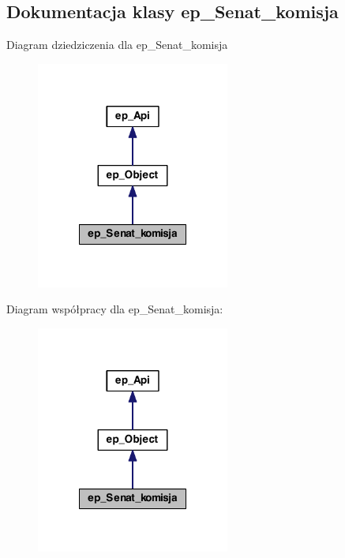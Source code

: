 \hypertarget{classep___senat__komisja}{\subsection{Dokumentacja klasy ep\-\_\-\-Senat\-\_\-komisja}
\label{classep___senat__komisja}
}


Diagram dziedziczenia dla ep\-\_\-\-Senat\-\_\-komisja\nopagebreak
\begin{figure}[H]
\begin{center}
\leavevmode
\includegraphics[width=180pt]{classep___senat__komisja__inherit__graph}
\end{center}
\end{figure}


Diagram współpracy dla ep\-\_\-\-Senat\-\_\-komisja\-:\nopagebreak
\begin{figure}[H]
\begin{center}
\leavevmode
\includegraphics[width=180pt]{classep___senat__komisja__coll__graph}
\end{center}
\end{figure}
